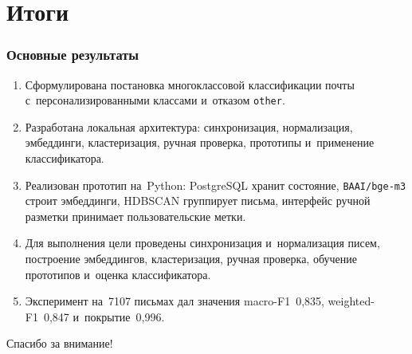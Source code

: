 \section{Итоги}

\begin{frame}
    \frametitle{Основные результаты}
    \begin{enumerate}
        \item Сформулирована постановка многоклассовой классификации почты
              с~персонализированными классами и~отказом \texttt{other}.
        \item Разработана локальная архитектура: синхронизация, нормализация,
              эмбеддинги, кластеризация, ручная проверка, прототипы
              и~применение классификатора.
        \item Реализован прототип на~Python: PostgreSQL хранит состояние,
              \texttt{BAAI/bge-m3} строит эмбеддинги, HDBSCAN группирует
              письма, интерфейс ручной разметки принимает пользовательские
              метки.
        \item Для выполнения цели проведены синхронизация и~нормализация
              писем, построение эмбеддингов, кластеризация, ручная проверка,
              обучение прототипов и~оценка классификатора.
        \item Эксперимент на~7107 письмах дал значения macro-F1~0{,}835,
              weighted-F1~0{,}847 и~покрытие~0{,}996.
    \end{enumerate}
\end{frame}

\begin{frame}
    \begin{center}
        \Huge
        Спасибо за внимание!
    \end{center}
\end{frame}
